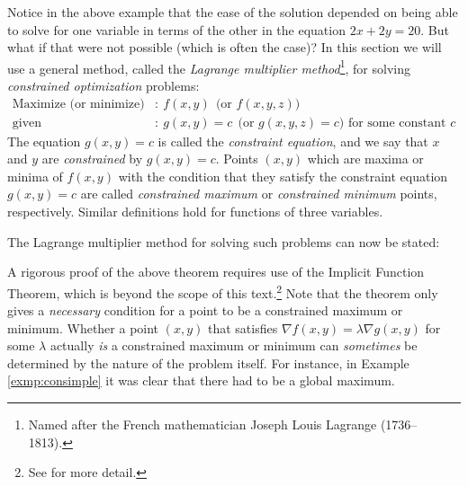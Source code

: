 Notice in the above example that the ease of the solution depended on being able to solve for one variable in terms of the other in the equation $2x+2y=20$. 
But what if that were not possible (which is often the case)?
In this section we will use a general method, called the
\emph{Lagrange multiplier method}\footnote{Named after the French mathematician Joseph Louis Lagrange (1736--1813).}, for
solving \emph{constrained optimization} problems:
\begin{align*}
 \text{Maximize (or minimize)}&: ~ f(x,y) ~~\text{(or $f(x,y,z)$)}\\
 \text{given}&: ~ g(x,y) = c ~~\text{(or $g(x,y,z) = c$) for some constant $c$}
\end{align*}
The equation $g(x,y) = c$ is called the \emph{constraint equation}, and we say that $x$ and $y$ are \emph{constrained}
by $g(x,y) = c$. Points $(x,y)$ which are maxima or minima of $f(x,y)$ with the condition that they satisfy
the constraint equation $g(x,y)=c$ are called \emph{constrained maximum} or \emph{constrained minimum} points,
respectively. Similar definitions hold for functions of three variables.

The Lagrange multiplier method for solving such problems can now be stated:


A rigorous proof of the above theorem requires use of the Implicit Function Theorem, which is beyond the scope of this
text.\footnote{See \cite[\S\,6.8]{tm} for more detail.} Note that the theorem only gives a \emph{necessary} condition
for a point to be a constrained maximum or minimum. Whether a point $(x,y)$ that satisfies
$\nabla f(x,y) = \lambda \nabla g(x,y)$ for some $\lambda$ actually \emph{is} a constrained maximum or minimum can
\emph{sometimes} be determined by the nature of the problem itself. For instance, in Example \ref{exmp:consimple} it was
clear that there had to be a global maximum.

